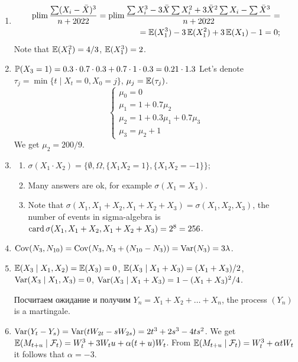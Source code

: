 \begin{enumerate}
    \item 
    \begin{align*}
        \plim \frac{\sum (X_i - \bar X)^3}{n+2022} = \plim \frac{\sum X_i^3 - 3\bar X\sum X_i^2 +3\bar X^2 \sum X_i - \sum \bar X^3}{n+2022} = \\
        = \E(X_1^3) - 3\E(X_1^2) + 3\E(X_1) - 1 = 0;
    \end{align*}
    Note that $\E(X_1^2) = 4/3$, $\E(X_1^3) = 2$.
    \item $\P(X_3 = 1) = 0.3\cdot 0.7\cdot 0.3 + 0.7\cdot 1\cdot 0.3 = 0.21 \cdot 1.3$
    Let's denote $\tau_j = \min \{t \mid X_t = 0, X_0 = j\}$, $\mu_j = \E(\tau_j)$.
    \[
    \begin{cases}
        \mu_0 = 0 \\
        \mu_1 = 1 + 0.7\mu_2 \\
        \mu_2 = 1 + 0.3\mu_1 + 0.7\mu_3 \\
        \mu_3 = \mu_2 + 1 
    \end{cases}    
    \]
    We get $\mu_2 = 200/9$.
    \item \begin{enumerate}
        \item $\sigma(X_1 \cdot X_2) = \{\emptyset, \Omega, \{X_1 X_2 = 1\}, \{X_1 X_2 = -1\}\}$;
        \item Many answers are ok, for example $\sigma(X_1 = X_3)$.
        \item Note that $\sigma(X_1, X_1 + X_2, X_1+ X_2+X_3) = \sigma(X_1, X_2, X_3)$, the number of events in sigma-algebra is
        $\card \sigma(X_1, X_1 + X_2, X_1+ X_2+X_3) = 2^8 = 256$.
    \end{enumerate}
    \item $\Cov(N_3, N_{10}) = \Cov(N_3, N_3 + (N_{10} - N_3)) = \Var(N_3) = 3\lambda$.
    \item $\E(X_3 \mid X_1, X_2) = \E(X_3) = 0$, $\E(X_3 \mid X_1 + X_3) = (X_1 + X_3) / 2$, $\Var(X_3 \mid X_1, X_3) = 0$,
    $\Var(X_3 \mid X_1 + X_3) = 1 - (X_1 + X_3)^2/4$.
    
    Посчитаем ожидание и получим $Y_n = X_1 + X_2 + \ldots + X_n$, the process $(Y_n)$ is a martingale.
    \item $\Var(Y_t - Y_s) = \Var(tW_{2t} - sW_{2s}) = 2t^3 + 2s^3 - 4ts^2$.
    We get $\E(M_{t+u} \mid \mathcal F_t ) = W_t^3 + 3W_t u  + \alpha(t + u) W_t$.
    From $\E(M_{t+u} \mid \mathcal F_t ) = W_t^3 + \alpha t W_t$ it follows that $\alpha = -3$.
\end{enumerate}



